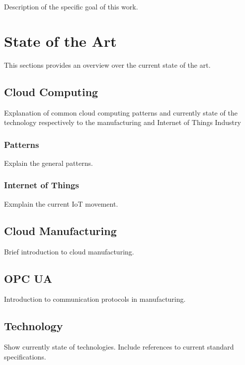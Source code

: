 \documentclass[
a4paper,
twoside,
bibliography=totoc,
headsepline,
cleardoublepage=empty,
parskip=half,
draft=false
]{scrbook}
\begin{document}
			Description of the specific goal of this work.
		
	\chapter{State of the Art} \label{ch:state_of_the_art}
	
		This sections provides an overview over the current state of the art.
		
		\section{Cloud Computing} \label{sec:cloud_computing}
		
			Explanation of common cloud computing patterns and currently state of the technology respectively to the manufacturing and Internet of Things Industry
			
			\subsection{Patterns} \label{subsec:patterns}
			
			Explain the general patterns.
			
			\subsection{Internet of Things} \label{subsec:internet_of_things}
			
			Exmplain the current IoT movement.
		
		\section{Cloud Manufacturing} \label{sec:cloud_manufacturing}
		
			Brief introduction to cloud manufacturing.
			
		\section{OPC UA} \label{sec:opc_ua}
		
			Introduction to communication protocols in manufacturing.
				
		\section{Technology} \label{sec:technology}
		
			Show currently state of technologies. Include references to current standard specifications.
			
\end{document}

